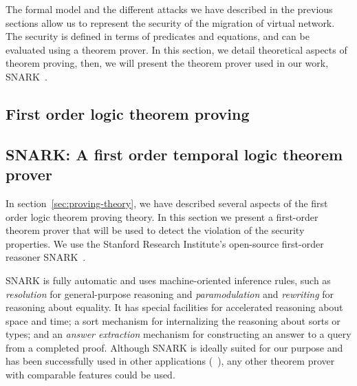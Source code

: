 The formal model and the different attacks we have described in the previous sections allow us to represent the security of the migration of virtual network. The security is defined in terms of predicates and equations, and can be evaluated using a theorem prover.
In this section, we detail theoretical aspects of theorem proving, then, we will present the theorem prover used in our work, SNARK~\cite{snark-Stickel2000}.

\subsection{First order logic theorem proving}



\subsection{SNARK: A first order temporal logic theorem prover}
\label{sec:proof-detects-violation}
In section~\ref{sec:proving-theory}, we have described several aspects of the first order logic theorem proving theory.
In this section we  present a first-order theorem prover that will be used to detect the violation of the security properties.
We use the Stanford Research Institute's open-source first-order reasoner SNARK~\cite{snark-Stickel2000}.

SNARK is fully automatic and uses machine-oriented inference rules, such as \textit{resolution} for general-purpose reasoning and \textit{paramodulation} and \textit{rewriting} for reasoning about equality.
It has special facilities
for accelerated reasoning about space and time; a sort mechanism for internalizing the reasoning about sorts or types; and an \textit{answer extraction} mechanism for constructing an answer to a query from a completed proof. 
Although SNARK is ideally suited for our purpose and has been successfully used in other applications (\eg~\cite{AICPub2006:2015}), any other theorem prover with comparable features could be used.

